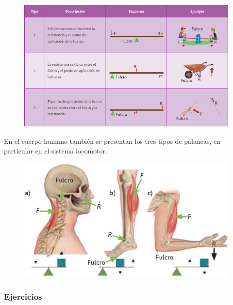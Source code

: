 \documentclass[11pt]{book}
\begin{document}
\begin{figure}[H]
  \centering
  \includegraphics[width=0.9\linewidth]{palanca_clase.jpg}
  \label{fig:palanca_clase}
\end{figure}

En el cuerpo humano también se presentan los tres tipos de palancas, en particular en el sistema locomotor.
\begin{figure}[H]
  \centering
  \includegraphics[width=0.6\linewidth]{palanca_body.jpg}
  \label{fig:palanca_body}
\end{figure}

\subsubsection{Ejercicios}
\end{document}
